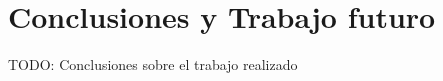 \chapter{Conclusiones y Trabajo futuro\label{sec:conclusiones}}

TODO: Conclusiones sobre el trabajo realizado
